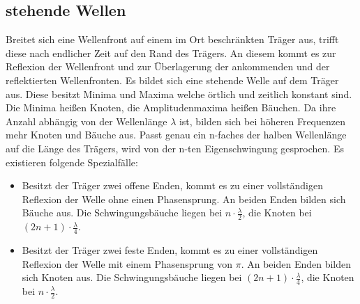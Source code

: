 \subsection{stehende Wellen}
Breitet sich eine Wellenfront auf einem im Ort beschränkten Träger aus, trifft diese
nach endlicher Zeit auf den Rand des Trägers. An diesem kommt es zur Reflexion
 der Wellenfront und zur Überlagerung der ankommenden und der reflektierten
  Wellenfronten. Es bildet sich eine stehende Welle auf dem Träger aus. Diese besitzt
   Minima und Maxima welche örtlich und zeitlich konstant sind. Die Minima heißen Knoten,
    die Amplitudenmaxima heißen Bäuchen.
      Da ihre Anzahl abhängig
      von der Wellenlänge $\lambda$ ist, bilden sich bei höheren Frequenzen mehr Knoten und Bäuche aus. Passt genau ein n-faches der halben Wellenlänge
       auf die Länge des Trägers, wird von der n-ten Eigenschwingung gesprochen. Es existieren
    folgende Spezialfälle:
    \begin{itemize}
      \item Besitzt der Träger zwei offene Enden, kommt es zu einer vollständigen
       Reflexion der Welle ohne einen Phasensprung. An beiden Enden bilden sich
        Bäuche aus. Die Schwingungsbäuche liegen bei $n \cdot \frac{\lambda}{2}$,
        die Knoten bei $(2n+1) \cdot \frac{\lambda}{4}$.

\item Besitzt der Träger zwei feste Enden, kommt es zu einer vollständigen
 Reflexion der Welle mit einem Phasensprung von $\pi$. An beiden Enden bilden sich Knoten aus.
 Die Schwingungsbäuche liegen bei $(2n+1) \cdot \frac{\lambda}{4}$,
 die Knoten bei $n \cdot \frac{\lambda}{2}$.
      \end{itemize}


